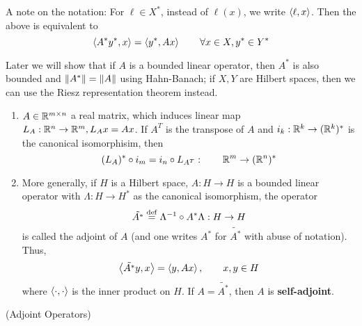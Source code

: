 \documentclass{article}
\begin{document}
A note on the notation: For \(\ell \in X^*\), instead of \(\ell(x)\), we write \(\left<{\ell},{x}\right>\). Then the above is equivalent to
\[\left<{A^* y^*},{x}\right> = \left<{y^*},{A x}\right> \qquad \forall x \in X, y^* \in Y^*\]  

Later we will show that if \(A\) is a bounded linear operator, then \(A^*\) is also bounded and \(\left\|{A^*}\right\|=\left\|{A}\right\|\)
using Hahn-Banach; if \(X, Y\) are Hilbert spaces, then we can use the Riesz representation theorem instead.

\begin{example}
    \begin{enumerate}[1)]
        \item \(A \in \mathbb{R}^{m \times n}\) a real matrix, which induces linear map \(L_A: \mathbb{R}^n \to \mathbb{R}^m, L_Ax=Ax\).
              If \(A^T\) is the transpose of \(A\) and \(i_k: \mathbb{R}^k \to (\mathbb{R}^k)^* \) is the canonical isomorphisim, then
              \[(L_A)^* \circ i_m = i_n \circ L_{A^T}: \qquad \mathbb{R}^m \to (\mathbb{R}^n)^*\]
        \item More generally, if \(H\) is a Hilbert space, \(A: H \to H\) is a bounded linear operator with \(\Lambda: H\to H^*\) as the
                canonical isomorphism, the operator
                \[\tilde{A^*} \overset{\rm{def}}{=} \Lambda^{-1} \circ A^* \Lambda: H \to H\]
            is called the adjoint of \(A\) (and one writes \(A^*\) for \(\tilde{A^*}\) with abuse of notation). Thus,
            \[\left<{\tilde{A^*}y},{x}\right> = \left<{y},{Ax}\right>, \qquad x,y \in H\]
            where \(\left<{\cdot},{\cdot}\right>\) is the inner product on \(H\). If \(A=\tilde{A^*}\), then \(A\) is \textbf{self-adjoint}.
    \end{enumerate}
\end{example}  


\begin{definition}
    (Adjoint Operators)
\end{definition}    



\begin{remark}
    
\end{remark}
\end{document}
